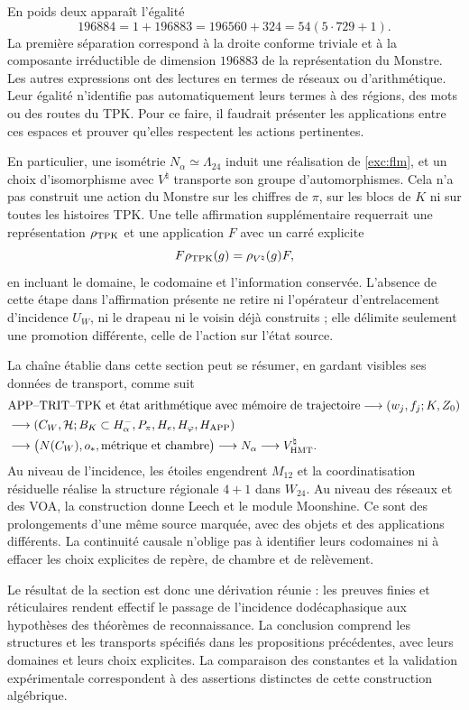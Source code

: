 En poids deux apparaît l'égalité
\[
 196884=1+196883=196560+324=54(5\cdot729+1).
\]
La première séparation correspond à la droite conforme triviale et à la
composante irréductible de dimension $196883$ de la représentation
du Monstre. Les autres expressions ont des lectures en termes de réseaux ou
d'arithmétique. Leur égalité n'identifie pas automatiquement leurs termes
à des régions, des mots ou des routes du TPK. Pour ce faire, il faudrait
présenter les applications entre ces espaces et prouver qu'elles respectent les
actions pertinentes.

En particulier, une isométrie $N_\alpha\simeq\Lambda_{24}$ induit
une réalisation de \eqref{exc:flm}, et un choix d'isomorphisme
avec $V^\natural$ transporte son groupe d'automorphismes. Cela n'a pas
construit une action du Monstre sur les chiffres de
$\pi$, sur les blocs de $K$ ni sur toutes les histoires TPK.
Une telle affirmation supplémentaire requerrait une représentation
$\rho_{\rm TPK}$ et une application $F$ avec un carré explicite
\[
 F\rho_{\rm TPK}(g)=\rho_{V^\natural}(g)F,
\]
en incluant le domaine, le codomaine et l'information conservée. L'absence
de cette étape dans l'affirmation présente ne retire ni l'opérateur d'entrelacement
d'incidence $U_W$, ni le drapeau ni le voisin déjà construits ; elle
délimite seulement une promotion différente, celle de l'action sur l'état source.

La chaîne établie dans cette section peut se résumer, en gardant visibles ses données de transport, comme suit
\begin{align*}
 &\text{APP--TRIT--TPK et état arithmétique avec mémoire de trajectoire}
   \longrightarrow (w_j,f_j;K,Z_0)\\
 &\longrightarrow (C_W,\mathcal H;B_K\subset H^-_\alpha,
                   P_\pi,H_e,H_\varphi,H_{\rm APP})\\
 &\longrightarrow \bigl(N(C_W),o_*,\text{métrique et chambre}\bigr)
   \longrightarrow N_\alpha
   \longrightarrow V^\natural_{\rm HMT}.
\end{align*}
Au niveau de l'incidence, les étoiles engendrent $M_{12}$ et la
coordinatisation résiduelle réalise la structure régionale $4+1$ dans $W_{24}$.
Au niveau des réseaux et des VOA, la construction donne Leech et le module
Moonshine. Ce sont des prolongements d'une même source marquée, avec
des objets et des applications différents. La continuité causale n'oblige pas à
identifier leurs codomaines ni à effacer les choix explicites
de repère, de chambre et de relèvement.

Le résultat de la section est donc une dérivation réunie :
les preuves finies et réticulaires rendent effectif le passage de
l’incidence dodécaphasique aux hypothèses des théorèmes de
reconnaissance. La conclusion comprend les structures et les
transports spécifiés dans les propositions précédentes, avec leurs
domaines et leurs choix explicites. La comparaison des constantes et la
validation expérimentale correspondent à des assertions distinctes de cette
construction algébrique.
